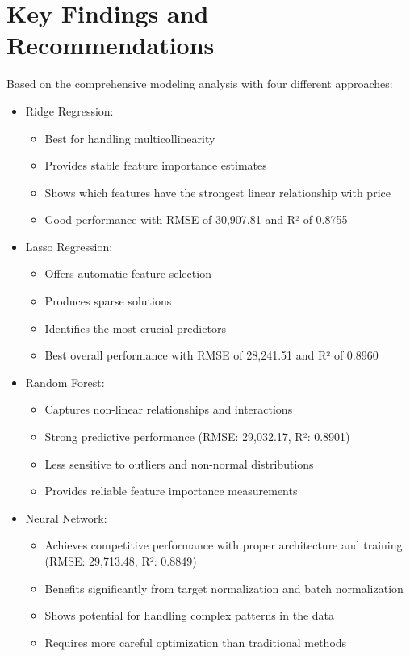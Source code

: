 \documentclass[12pt]{report}
\begin{document}
\section{Key Findings and Recommendations}
Based on the comprehensive modeling analysis with four different approaches:
\begin{itemize}
    \item Ridge Regression:
    \begin{itemize}
        \item Best for handling multicollinearity
        \item Provides stable feature importance estimates
        \item Shows which features have the strongest linear relationship with price
        \item Good performance with RMSE of 30,907.81 and R² of 0.8755
    \end{itemize}
    \item Lasso Regression:
    \begin{itemize}
        \item Offers automatic feature selection
        \item Produces sparse solutions
        \item Identifies the most crucial predictors
        \item Best overall performance with RMSE of 28,241.51 and R² of 0.8960
    \end{itemize}
    \item Random Forest:
    \begin{itemize}
        \item Captures non-linear relationships and interactions
        \item Strong predictive performance (RMSE: 29,032.17, R²: 0.8901)
        \item Less sensitive to outliers and non-normal distributions
        \item Provides reliable feature importance measurements
    \end{itemize}
    \item Neural Network:
    \begin{itemize}
        \item Achieves competitive performance with proper architecture and training (RMSE: 29,713.48, R²: 0.8849)
        \item Benefits significantly from target normalization and batch normalization
        \item Shows potential for handling complex patterns in the data
        \item Requires more careful optimization than traditional methods
    \end{itemize}
\end{itemize}
\end{document}
